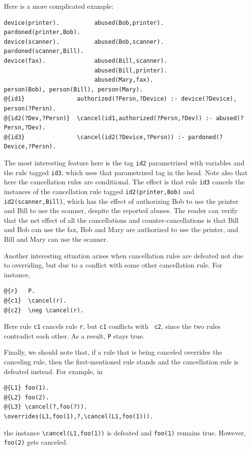 \documentclass[11pt]{article}
\newcommand{\bs}{\textbackslash}
\begin{document}
Here is a more complicated example:
\begin{verbatim}
device(printer).          abused(Bob,printer).       pardoned(printer,Bob).
device(scanner).          abused(Bob,scanner).       pardoned(scanner,Bill).
device(fax).              abused(Bill,scanner).
                          abused(Bill,printer).
                          abused(Mary,fax).
person(Bob), person(Bill), person(Mary).
@{id1}               authorized(?Persn,?Device) :- device(?Device), person(?Persn).
@{id2(?Dev,?Persn)}  \cancel(id1,authorized(?Persn,?Dev)) :- abused(?Persn,?Dev).
@{id3}               \cancel(id2(?Device,?Persn)) :- pardoned(?Device,?Persn).
\end{verbatim}
The most interesting feature here is the tag {\tt id2} parametrized with
variables and the rule tagged {\tt id3}, which uses that parametrized
tag in the head. Note also that here the cancellation rules are conditional.
The effect is that rule {\tt id3} cancels the instances 
of the cancellation rule tagged {\tt id2(printer,Bob)} and
{\tt id2(scanner,Bill)}, which has the effect of authorizing Bob to use the
printer and Bill to use the scanner, despite the reported abuses.  
The reader can verify that the net effect of all the cancellations and
counter-cancellations is that Bill and Bob can use the fax, Bob and Mary
are authorized to use the printer, and Bill and Mary can use the scanner.

Another interesting situation arises when cancellation rules are defeated
not due to overriding, but due to a conflict with some other cancellation
rule. For instance,
\begin{verbatim}
@{r}   P.
@{c1}  \cancel(r).
@{c2}  \neg \cancel(r).
\end{verbatim}
Here rule {\tt c1} cancels rule {\tt r}, but {\tt c1} conflicts with {\tt
  c2}, since the two rules contradict each other. As a result, {\tt P}      
stays true.

Finally, we should note that, if a rule that is being canceled overrides
the canceling rule, then the first-mentioned rule stands and the
cancellation rule is defeated instead. For example, in
\begin{verbatim}
@{L1} foo(1).
@{L2} foo(2).
@{L3} \cancel(?,foo(?)).  
\overrides(L1,foo(1),?,\cancel(L1,foo(1))).
\end{verbatim}
the instance {\tt \bs{}cancel(L1,foo(1))} is defeated and {\tt foo(1)}
remains true. However, {\tt foo(2)} gets canceled.
\end{document}
